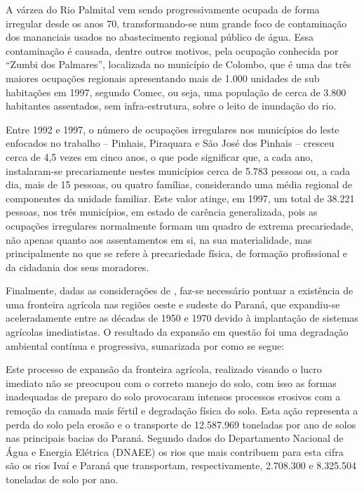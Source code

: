 	A várzea do Rio Palmital vem sendo progressivamente ocupada de forma irregular desde os anos 70, transformando-se num grande foco de contaminação dos mananciais usados no abastecimento regional público de água. Essa contaminação é causada, dentre outros motivos, pela ocupação conhecida por “Zumbi dos Palmares”, localizada no município de Colombo, que é uma das três maiores ocupações regionais apresentando mais de 1.000 unidades de sub habitações em 1997, segundo Comec, ou seja, uma população de cerca de 3.800 habitantes assentados, sem infra-estrutura, sobre o leito de inundação do rio. 
	
	Entre 1992 e 1997, o número de ocupações irregulares nos municípios do leste enfocados no trabalho – Pinhais, Piraquara e São José dos Pinhais – cresceu cerca de 4,5 vezes em cinco anos, o que pode significar que, a cada ano, instalaram-se precariamente nestes municípios cerca de 5.783 pessoas ou, a cada dia, mais de 15 pessoas, ou quatro famílias, considerando uma média regional de componentes da unidade familiar. Este valor atinge, em 1997, um total de 38.221 pessoas, nos três municípios, em estado de carência generalizada, pois as ocupações irregulares normalmente formam um quadro de extrema precariedade, não apenas quanto aos assentamentos em si, na sua materialidade, mas principalmente no que se refere à precariedade física, de formação profissional e da cidadania dos seus moradores.
	
	Finalmente, dadas as considerações de , faz-se necessário pontuar a existência de uma fronteira agrícola nas regiões oeste e sudeste do Paraná, que expandiu-se aceleradamente entre as décadas de 1950 e 1970 devido à implantação de sistemas agrícolas imediatistas. O resultado da expansão em questão foi uma degradação ambiental contínua e progressiva, sumarizada por  como se segue:
	
	\begin{citacao}
		Este processo de expansão da fronteira agrícola, realizado visando o lucro imediato não se preocupou com o correto manejo do solo, com isso as formas inadequadas de preparo do solo provocaram intensos processos erosivos com a remoção da camada mais fértil e degradação física do solo. Esta ação representa a perda do solo pela erosão e o transporte de 12.587.969 toneladas por ano de solos nas principais bacias do Paraná. Segundo dados do Departamento Nacional de Água e Energia Elétrica (DNAEE) os rios que mais contribuem para esta cifra são os rios Ivaí e Paraná que transportam, respectivamente, 2.708.300 e 8.325.504 toneladas de solo por ano.
	\end{citacao}


